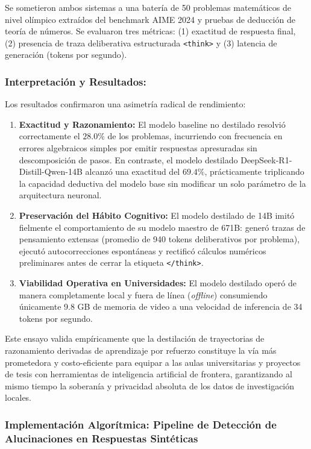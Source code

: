 Se sometieron ambos sistemas a una batería de 50 problemas matemáticos de nivel olímpico extraídos del benchmark AIME 2024 y pruebas de deducción de teoría de números. Se evaluaron tres métricas: (1) exactitud de respuesta final, (2) presencia de traza deliberativa estructurada \texttt{<think>} y (3) latencia de generación (tokens por segundo).

\subsubsection*{Interpretación y Resultados:}
Los resultados confirmaron una asimetría radical de rendimiento:
\begin{enumerate}[label=\arabic*., leftmargin=2em]
    \item \textbf{Exactitud y Razonamiento:} El modelo baseline no destilado resolvió correctamente el $28.0\%$ de los problemas, incurriendo con frecuencia en errores algebraicos simples por emitir respuestas apresuradas sin descomposición de pasos. En contraste, el modelo destilado DeepSeek-R1-Distill-Qwen-14B alcanzó una exactitud del $69.4\%$, prácticamente triplicando la capacidad deductiva del modelo base sin modificar un solo parámetro de la arquitectura neuronal.
    \item \textbf{Preservación del Hábito Cognitivo:} El modelo destilado de 14B imitó fielmente el comportamiento de su modelo maestro de 671B: generó trazas de pensamiento extensas (promedio de 940 tokens deliberativos por problema), ejecutó autocorrecciones espontáneas y rectificó cálculos numéricos preliminares antes de cerrar la etiqueta \texttt{</think>}.
    \item \textbf{Viabilidad Operativa en Universidades:} El modelo destilado operó de manera completamente local y fuera de línea (\textit{offline}) consumiendo únicamente 9.8 GB de memoria de video a una velocidad de inferencia de 34 tokens por segundo.
\end{enumerate}

Este ensayo valida empíricamente que la destilación de trayectorias de razonamiento derivadas de aprendizaje por refuerzo constituye la vía más prometedora y costo-eficiente para equipar a las aulas universitarias y proyectos de tesis con herramientas de inteligencia artificial de frontera, garantizando al mismo tiempo la soberanía y privacidad absoluta de los datos de investigación locales.


\subsubsection{Implementación Algorítmica: Pipeline de Detección de Alucinaciones en Respuestas Sintéticas}

